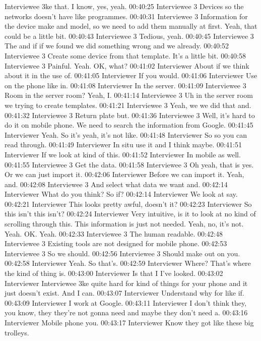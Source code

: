 Interviewee 3ke that. I know, yes, yeah.
00:40:25 Interviewee 3
Devices so the networks doesn't have like programmes.
00:40:31 Interviewee 3
Information for the device make and model, so we need to add them manually at first. Yeah, that could be a little bit.
00:40:43 Interviewee 3
Tedious, yeah.
00:40:45 Interviewee 3
The and if if we found we did something wrong and we already.
00:40:52 Interviewee 3
Create some device from that template. It's a little bit.
00:40:58 Interviewee 3
Painful. Yeah. OK, what?
00:41:02 Interviewer
About if we think about it in the use of.
00:41:05 Interviewer
If you would.
00:41:06 Interviewer
Use on the phone like in.
00:41:08 Interviewer
In the server.
00:41:09 Interviewee 3
Room in the server room? Yeah, I.
00:41:14 Interviewee 3
Uh in the server room we trying to create templates.
00:41:21 Interviewee 3
Yeah, we we did that and.
00:41:32 Interviewee 3
Return plate but.
00:41:36 Interviewee 3
Well, it's hard to do it on mobile phone. We need to search the information from Google.
00:41:45 Interviewer
Yeah. So it's yeah, it's not like.
00:41:48 Interviewer
So so you can read through.
00:41:49 Interviewer
In situ use it and I think maybe.
00:41:51 Interviewer
If we look at kind of this.
00:41:52 Interviewer
In mobile as well.
00:41:55 Interviewee 3
Get the data.
00:41:58 Interviewee 3
Oh yeah, that is yes. Or we can just import it.
00:42:06 Interviewer
Before we can import it. Yeah, and.
00:42:08 Interviewee 3
And select what data we want and.
00:42:14 Interviewer
What do you think? So if?
00:42:14 Interviewer
We look at say.
00:42:21 Interviewer
This looks pretty awful, doesn't it?
00:42:23 Interviewer
So this isn't this isn't?
00:42:24 Interviewer
Very intuitive, is it to look at no kind of scrolling through this. This information is just not needed. Yeah, no, it's not. Yeah. OK. Yeah.
00:42:33 Interviewee 3
The human readable.
00:42:48 Interviewee 3
Existing tools are not designed for mobile phone.
00:42:53 Interviewee 3
So we should.
00:42:56 Interviewee 3
Should make out on you.
00:42:58 Interviewer
Yeah. So that's.
00:42:59 Interviewer
Where? That's where the kind of thing is.
00:43:00 Interviewer
Is that I I've looked.
00:43:02 Interviewer
Interviewee 3ke quite hard for kind of things for your phone and it just doesn't exist. And I can.
00:43:07 Interviewer
Understand why for like if.
00:43:09 Interviewer
I work at Google.
00:43:11 Interviewer
I don't think they, you know, they they're not gonna need and maybe they don't need a.
00:43:16 Interviewer
Mobile phone you.
00:43:17 Interviewer
Know they got like these big trolleys.
